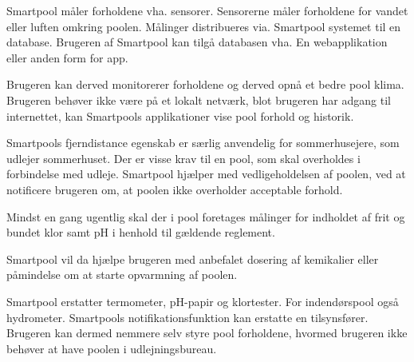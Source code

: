 Smartpool måler forholdene vha. sensorer. Sensorerne måler forholdene for vandet eller luften omkring poolen. Målinger distribueres via. Smartpool systemet til en database. Brugeren af Smartpool kan tilgå databasen vha. En webapplikation eller anden form for app. 

Brugeren kan derved monitorerer forholdene og derved opnå et bedre pool klima. Brugeren behøver ikke være på et lokalt netværk, blot brugeren har adgang til internettet, kan Smartpools applikationer vise pool forhold og historik. 

Smartpools fjerndistance egenskab er særlig anvendelig for sommerhusejere, som udlejer sommerhuset. Der er visse krav til en pool, som skal overholdes i forbindelse med udleje. Smartpool hjælper med vedligeholdelsen af poolen, ved at notificere brugeren om, at poolen ikke overholder acceptable forhold. 

Mindst en gang ugentlig skal der i pool foretages målinger for indholdet af frit og bundet klor samt pH i henhold til gældende reglement.

Smartpool vil da hjælpe brugeren med anbefalet dosering af kemikalier eller påmindelse om at starte opvarmning af poolen.

Smartpool erstatter termometer, pH-papir og klortester. For indendørspool også hydrometer. Smartpools notifikationsfunktion kan erstatte en tilsynsfører. Brugeren kan dermed nemmere selv styre pool forholdene, hvormed brugeren ikke behøver at have poolen i udlejningsbureau.
